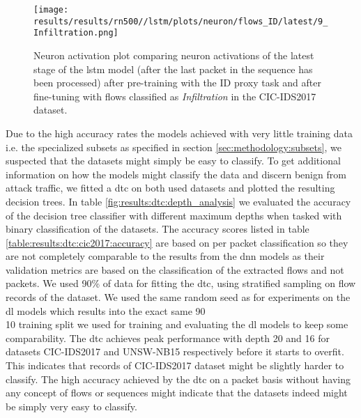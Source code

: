 \begin{figure}[!htbp]
	\centering
	\texttt{[image: results/results/rn500//lstm/plots/neuron/flows\_ID/latest/9\_Infiltration.png]}
	\caption{Neuron activation plot comparing neuron activations of the latest stage of the \gls{lstm} model (after the last packet in the sequence has been processed) after pre-training with the ID proxy task and after fine-tuning with flows classified as \textit{Infiltration} in the CIC-IDS2017 dataset.}
	\label{fig:results:lstm:neuron:cic17_id_infiltration}
\end{figure}

Due to the high accuracy rates the models achieved with very little training data i.e. the specialized subsets as specified in section \ref{sec:methodology:subsets}, we suspected that the datasets might simply be easy to classify. To get additional information on how the models might classify the data and discern benign from attack traffic, we fitted a \gls{dtc} on both used datasets and plotted the resulting decision trees. In table \ref{fig:results:dtc:depth_analysis} we evaluated the accuracy of the decision tree classifier with different maximum depths when tasked with binary classification of the datasets. 
The accuracy scores listed in table \ref{table:results:dtc:cic2017:accuracy} are based on per packet classification so they are not completely comparable to the results from the \gls{dnn} models as their validation metrics are based on the classification of the extracted flows and not packets. 
We used 90\% of data for fitting the \gls{dtc}, using stratified sampling on flow records of the dataset. 
We used the same random seed as for experiments on the \gls{dl} models which results into the exact same 90\\10 training split we used for training and evaluating the \gls{dl} models to keep some comparability. The \gls{dtc} achieves peak performance with depth 20 and 16 for datasets CIC-IDS2017 and UNSW-NB15 respectively before it starts to overfit. 
This indicates that records of CIC-IDS2017 dataset might be slightly harder to classify.
The high accuracy achieved by the \gls{dtc} on a packet basis without having any concept of flows or sequences might indicate that the datasets indeed might be simply very easy to classify. 

